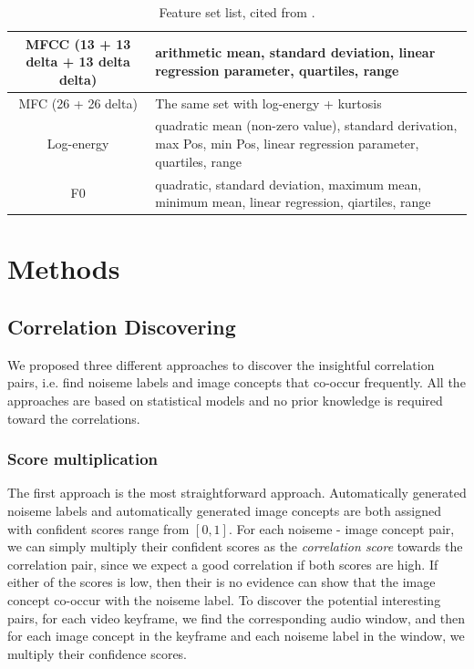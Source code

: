 \documentclass[conference, 11pt, onecolumn]{IEEEtran}
\begin{document}
\begin{table}[h]
\normalsize
\begin{center}
\caption{Feature set list, cited from \cite{wang2014exploring}.}
\label{table:features}
\begin{tabular}{| c | p{10cm} |}
\hline
MFCC (13 + 13 delta + 13 delta delta) & arithmetic mean, standard deviation, linear regression parameter, quartiles, range \\
\hline
MFC (26 + 26 delta) & The same set with log-energy + kurtosis \\
\hline
Log-energy & quadratic mean (non-zero value), standard derivation, max Pos, min Pos, linear regression parameter, quartiles, range \\
\hline
F0 & quadratic, standard deviation, maximum mean, minimum mean, linear regression, qiartiles, range \\
\hline
\end{tabular}
\end{center}
\end{table}

\section{Methods}
\label{section:methods}

\subsection{Correlation Discovering}
We proposed three different approaches to discover the insightful correlation pairs, i.e. find noiseme labels and image concepts that co-occur frequently. All the approaches are based on statistical models and no prior knowledge is required toward the correlations.

\subsubsection{Score multiplication}
The first approach is the most straightforward approach. Automatically generated noiseme labels and automatically generated image concepts are both assigned with confident scores range from $[0, 1]$. For each noiseme - image concept pair, we can simply multiply their confident scores as the \emph{correlation score} towards the correlation pair, since we expect a good correlation if both scores are high. If either of the scores is low, then their is no evidence can show that the image concept co-occur with the noiseme label. To discover the potential interesting pairs, for each video keyframe, we find the corresponding audio window, and then for each image concept in the keyframe and each noiseme label in the window, we multiply their confidence scores.
\end{document}
